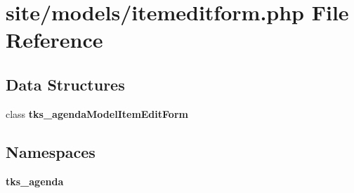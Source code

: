 \section{site/models/itemeditform.php File Reference}
\label{models_2itemeditform_8php}
\subsection*{Data Structures}
\begin{DoxyCompactItemize}
\item 
class \textbf{ tks\+\_\+agenda\+Model\+Item\+Edit\+Form}
\end{DoxyCompactItemize}
\subsection*{Namespaces}
\begin{DoxyCompactItemize}
\item 
 \textbf{ tks\+\_\+agenda}
\end{DoxyCompactItemize}
